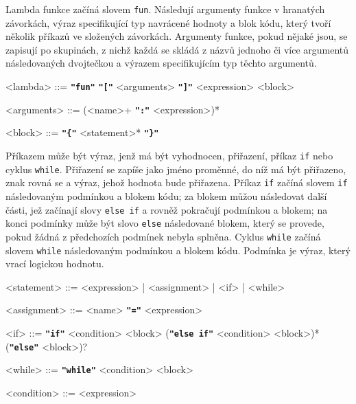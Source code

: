 \documentclass[a4paper,12pt]{article}
\def\quote #1{"#1"}
\def\emphasis #1{\textbf{\texttt{\quote{#1}}}}
\begin{document}
Lambda funkce začíná slovem \texttt{fun}. Následují argumenty funkce v hranatých závorkách, výraz specifikující typ navrácené hodnoty a blok kódu, který tvoří několik příkazů ve složených závorkách. Argumenty funkce, pokud nějaké jsou, se zapisují po skupinách, z nichž každá se skládá z názvů jednoho či více argumentů následovaných dvojtečkou a výrazem specifikujícím typ těchto argumentů.
\begin{grammar}
<lambda> ::= \emphasis{fun} \emphasis{[} <arguments> \emphasis{]} <expression> <block>

<arguments> ::= (<name>+ \emphasis{:} <expression>)*

<block> ::= \emphasis{\{} <statement>* \emphasis{\}}
\end{grammar}

Příkazem může být výraz, jenž má být vyhodnocen, přiřazení, příkaz \texttt{if} nebo cyklus \texttt{while}. Přiřazení se zapíše jako jméno proměnné, do níž má být přiřazeno, znak rovná se a výraz, jehož hodnota bude přiřazena. Příkaz \texttt{if} začíná slovem \texttt{if} následovaným podmínkou a blokem kódu; za blokem můžou následovat další části, jež začínají slovy \texttt{else if} a rovněž pokračují podmínkou a blokem; na konci podmínky může být slovo \texttt{else} následované blokem, který se provede, pokud žádná z předchozích podmínek nebyla splněna. Cyklus \texttt{while} začíná slovem \texttt{while} následovaným podmínkou a blokem kódu. Podmínka je výraz, který vrací logickou hodnotu.
\begin{grammar}
<statement> ::= <expression> | <assignment> | <if> | <while>

<assignment> ::= <name> \emphasis{=} <expression>

<if> ::= \emphasis{if} <condition> <block> (\emphasis{else if} <condition> <block>)* (\emphasis{else} <block>)?

<while> ::= \emphasis{while} <condition> <block>

<condition> ::= <expression>
\end{grammar}
\end{document}
